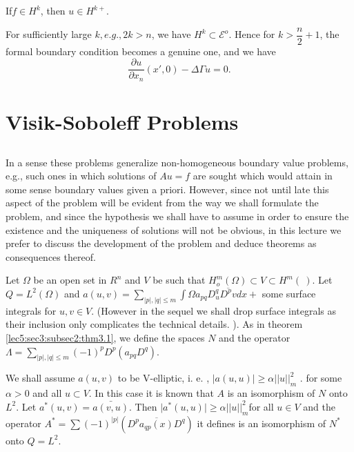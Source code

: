 \begin{coro*}%
  If\pageoriginale $f \in H^k$, then $u \in H^{k +}$. 
\end{coro*}

For sufficiently large $k, e. g. , 2k > n$, we have $H^k \subset
\mathscr{E}^o$. Hence for $k > \dfrac{n}{2} + 1$, the formal boundary
condition becomes a genuine one, and we have  
$$
\frac{\partial u}{\partial x_n} (x', 0) - \Delta \Gamma u = 0. 
$$

\section{Visik-Soboleff Problems}\label{lec18:sec10} %

\subsection{}\label{lec18:sec10:subsec1}

In a sense these problems generalize non-homogeneous boundary value
problems, e.g., such ones in which solutions of $Au = f$ are sought
which would attain in some sense boundary values given a
priori. However, since not until late this aspect of the problem will
be evident from the way we shall formulate the problem, and since the
hypothesis we shall have to assume in order to ensure the existence
and the uniqueness of solutions will not be obvious, in this lecture
we prefer to discuss the development of the problem and deduce
theorems as consequences thereof.  

Let $\Omega$ be an open set in $R^n$ and $V$ be such that $H^m_o
(\Omega ) \subset V \subset H^m ( ~ )$. Let $Q = L^2 (\Omega )$ and
$a(u, v) = \sum\limits_{|p| , |q| \leq m} \int \Omega a_{pq} D^q_u \overline{D^p
  v} dx + $ some surface integrals for $u, v \in  V$. (However in the
sequel we shall drop surface integrals as their inclusion only
complicates the technical details. ). As in theorem \ref{lec5:sec3:subsec2:thm3.1}, we define
the spaces $N$ and the operator $\Lambda = \sum_{|p| , |q| \leq m}
(-1)^p D^p (a_{pq} D^q)$.  

We shall assume $a(u, v)$ to be V-elliptic, i. e. , $| a(u, u) | \geq
\alpha || u ||^2_m$ . for some $\alpha > 0$ and all $u \subset V$. In
this case it is known that $A$ is an isomorphism of $N$ onto
$L^2$. Let $a^* (u, v) = \bar{a(v, u)}$. Then $\big| a^* (u, u) \big|
\geq \alpha || u ||^2_m$\pageoriginale for all $u \in V$ and the operator
$A^* = \sum (-1)^{|p|} (D^p \overline{a_{qp}(x)}D^q)$ it defines is an
isomorphism of $N^*$ onto $Q = L^2$.  

